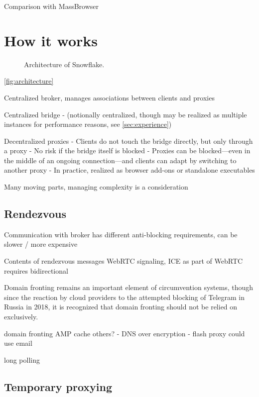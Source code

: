\documentclass[letterpaper,twocolumn]{article}
\begin{document}
Comparison with MassBrowser~\cite{Nasr2020a}

\section{How it works}


\begin{figure}
\caption{
Architecture of Snowflake.
}
\label{fig:architecture}
\end{figure}

\autoref{fig:architecture}

Centralized broker, manages associations between clients and proxies

Centralized bridge
- (notionally centralized, though may be realized as multiple instances for performance reasons, see \autoref{sec:experience})

Decentralized proxies
- Clients do not touch the bridge directly, but only through a proxy
- No risk if the bridge itself is blocked
- Proxies can be blocked---even in the middle of an ongoing connection---and clients can adapt by switching to another proxy
- In practice, realized as browser add-ons or standalone executables

Many moving parts, managing complexity is a consideration

\subsection{Rendezvous}


Communication with broker has different anti-blocking requirements,
can be slower / more expensive

Contents of rendezvous messages
WebRTC signaling, ICE as part of WebRTC
requires bidirectional

Domain fronting remains an important element of circumvention systems,
though since the reaction by cloud providers
to the attempted blocking of Telegram in Russia in 2018,
it is recognized that domain fronting should not be relied on exclusively.


domain fronting
AMP cache
others?
- DNS over encryption
- flash proxy could use email

long polling

\subsection{Temporary proxying}
\end{document}
